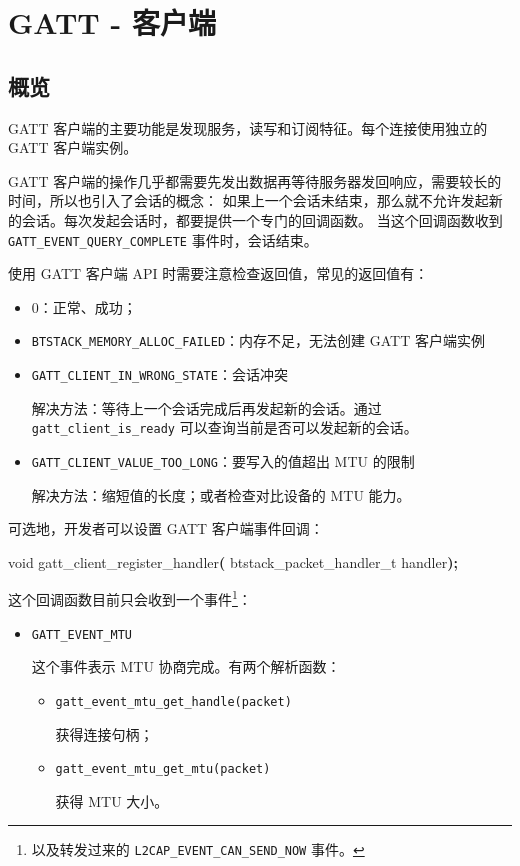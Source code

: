 \documentclass[
  12pt,
]{book}
\newenvironment{Shaded}{\begin{snugshade}}{\end{snugshade}}
\newcommand{\DataTypeTok}[1]{\textcolor[rgb]{0.13,0.29,0.53}{#1}}
\newcommand{\NormalTok}[1]{#1}
\newcommand{\OperatorTok}[1]{\textcolor[rgb]{0.81,0.36,0.00}{\textbf{#1}}}
\begin{document}
\hypertarget{ch-gatt-client}{%
\chapter{GATT - 客户端}\label{ch-gatt-client}}

\hypertarget{ux6982ux89c8-4}{%
\section{概览}\label{ux6982ux89c8-4}}

GATT 客户端的主要功能是发现服务，读写和订阅特征。每个连接使用独立的 GATT 客户端实例。

GATT 客户端的操作几乎都需要先发出数据再等待服务器发回响应，需要较长的时间，所以也引入了会话的概念：
如果上一个会话未结束，那么就不允许发起新的会话。每次发起会话时，都要提供一个专门的回调函数。
当这个回调函数收到 \texttt{GATT\_EVENT\_QUERY\_COMPLETE} 事件时，会话结束。

使用 GATT 客户端 API 时需要注意检查返回值，常见的返回值有：

\begin{itemize}
\item
  \(0\)：正常、成功；
\item
  \texttt{BTSTACK\_MEMORY\_ALLOC\_FAILED}：内存不足，无法创建 GATT 客户端实例
\item
  \texttt{GATT\_CLIENT\_IN\_WRONG\_STATE}：会话冲突

  解决方法：等待上一个会话完成后再发起新的会话。通过 \texttt{gatt\_client\_is\_ready} 可以查询当前是否可以发起新的会话。
\item
  \texttt{GATT\_CLIENT\_VALUE\_TOO\_LONG}：要写入的值超出 MTU 的限制

  解决方法：缩短值的长度；或者检查对比设备的 MTU 能力。
\end{itemize}

可选地，开发者可以设置 GATT 客户端事件回调：

\begin{Shaded}
\begin{Highlighting}[]
\DataTypeTok{void}\NormalTok{ gatt\_client\_register\_handler}\OperatorTok{(}
\NormalTok{  btstack\_packet\_handler\_t handler}\OperatorTok{);}
\end{Highlighting}
\end{Shaded}

这个回调函数目前只会收到一个事件\footnote{以及转发过来的 \texttt{L2CAP\_EVENT\_CAN\_SEND\_NOW} 事件。}：

\begin{itemize}
\item
  \texttt{GATT\_EVENT\_MTU}

  这个事件表示 MTU 协商完成。有两个解析函数：

  \begin{itemize}
  \item
    \texttt{gatt\_event\_mtu\_get\_handle(packet)}

    获得连接句柄；
  \item
    \texttt{gatt\_event\_mtu\_get\_mtu(packet)}

    获得 MTU 大小。
  \end{itemize}
\end{itemize}
\end{document}
